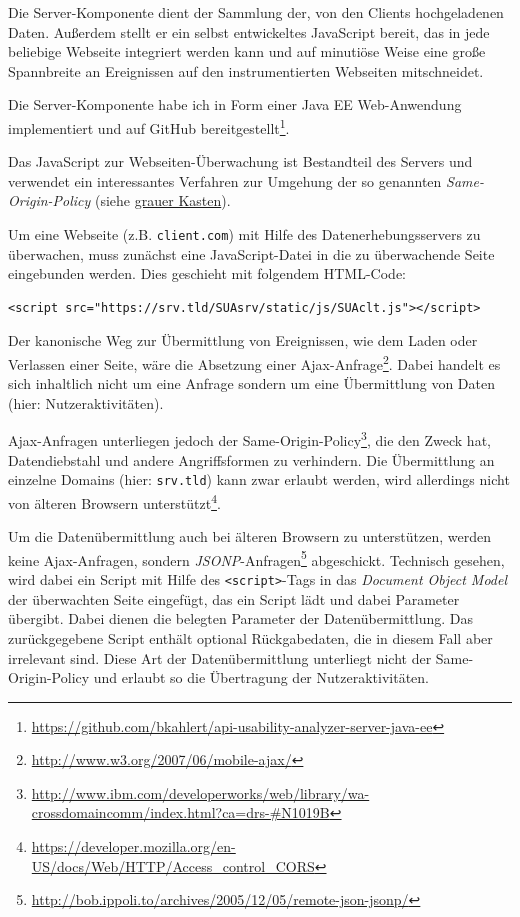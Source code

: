 Die Server-Komponente dient der Sammlung der, von den Clients hochgeladenen Daten. Außerdem stellt er ein selbst entwickeltes JavaScript bereit, das in jede beliebige Webseite integriert werden kann und auf minutiöse Weise eine große Spannbreite an Ereignissen auf den instrumentierten Webseiten mitschneidet.

Die Server-Komponente habe ich in Form einer Java EE Web-Anwendung implementiert und auf GitHub bereitgestellt\footnote{\url{https://github.com/bkahlert/api-usability-analyzer-server-java-ee}}.

Das JavaScript zur Webseiten-Überwachung ist Bestandteil des Servers und verwendet ein interessantes Verfahren zur Umgehung der so genannten \textit{Same-Origin-Policy} (siehe \hyperref[subsec:same-origin-policy]{grauer Kasten}).

\begin{furtherreading}[frametitle={Website-Überwachung im Detail}]
\label{subsec:same-origin-policy}
Um eine Webseite (z.B. \texttt{client.com}) mit Hilfe des Datenerhebungsservers zu überwachen, muss zunächst eine JavaScript-Datei in die zu überwachende Seite eingebunden werden. Dies geschieht mit folgendem HTML-Code:
\begin{verbatim}
<script src="https://srv.tld/SUAsrv/static/js/SUAclt.js"></script>
\end{verbatim}

Der kanonische Weg zur Übermittlung von Ereignissen, wie dem Laden oder Verlassen einer Seite, wäre die Absetzung einer Ajax-Anfrage\footnote{\url{http://www.w3.org/2007/06/mobile-ajax/}}. Dabei handelt es sich inhaltlich nicht um eine Anfrage sondern um eine Übermittlung von Daten (hier: Nutzeraktivitäten).

Ajax-Anfragen unterliegen jedoch der Same-Origin-Policy\footnote{\url{http://www.ibm.com/developerworks/web/library/wa-crossdomaincomm/index.html?ca=drs-\#N1019B}}, die den Zweck hat, Datendiebstahl und andere Angriffsformen zu verhindern. Die Übermittlung an einzelne Domains (hier: \texttt{srv.tld}) kann zwar erlaubt werden, wird allerdings nicht von älteren Browsern unterstützt\footnote{\url{https://developer.mozilla.org/en-US/docs/Web/HTTP/Access_control_CORS}}.

Um die Datenübermittlung auch bei älteren Browsern zu unterstützen, werden keine Ajax-Anfragen, sondern \textit{JSONP}-Anfragen\footnote{\url{http://bob.ippoli.to/archives/2005/12/05/remote-json-jsonp/}} abgeschickt. Technisch gesehen, wird dabei ein Script mit Hilfe des \texttt{<script>}-Tags in das \textit{Document Object Model} der überwachten Seite eingefügt, das ein Script lädt und dabei Parameter übergibt. Dabei dienen die belegten Parameter der Datenübermittlung. Das zurückgegebene Script enthält optional Rückgabedaten, die in diesem Fall aber irrelevant sind. Diese Art der Datenübermittlung unterliegt nicht der Same-Origin-Policy und erlaubt so die Übertragung der Nutzeraktivitäten.
\end{furtherreading}


